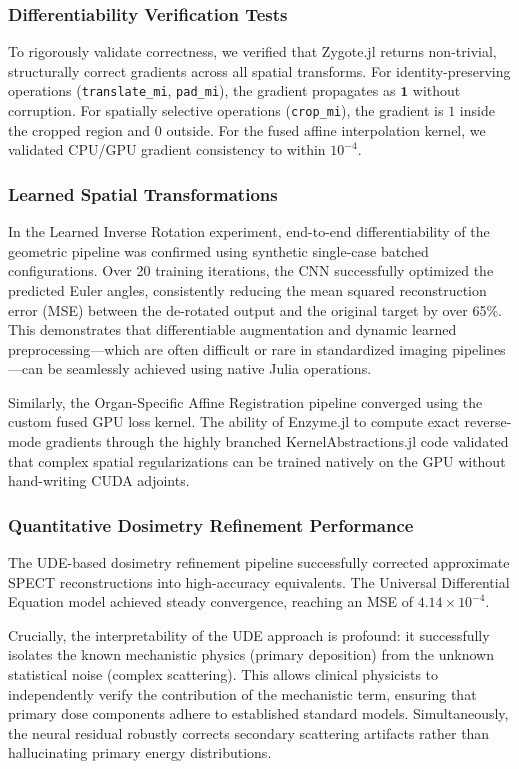 \documentclass[10pt,letterpaper]{article}
\begin{document}
\subsubsection*{Differentiability Verification Tests}
To rigorously validate correctness, we verified that Zygote.jl returns non-trivial, structurally correct gradients across all spatial transforms. For identity-preserving operations (\texttt{translate\_mi}, \texttt{pad\_mi}), the gradient propagates as $\mathbf{1}$ without corruption. For spatially selective operations (\texttt{crop\_mi}), the gradient is $1$ inside the cropped region and $0$ outside. For the fused affine interpolation kernel, we validated CPU/GPU gradient consistency to within $10^{-4}$.

\subsubsection*{Learned Spatial Transformations}
In the Learned Inverse Rotation experiment, end-to-end differentiability of the geometric pipeline was confirmed using synthetic single-case batched configurations. Over 20 training iterations, the CNN successfully optimized the predicted Euler angles, consistently reducing the mean squared reconstruction error (MSE) between the de-rotated output and the original target by over 65\%. This demonstrates that differentiable augmentation and dynamic learned preprocessing---which are often difficult or rare in standardized imaging pipelines \cite{Shi_2023}---can be seamlessly achieved using native Julia operations.

Similarly, the Organ-Specific Affine Registration pipeline converged using the custom fused GPU loss kernel. The ability of Enzyme.jl to compute exact reverse-mode gradients through the highly branched KernelAbstractions.jl code validated that complex spatial regularizations can be trained natively on the GPU without hand-writing CUDA adjoints.

\subsubsection*{Quantitative Dosimetry Refinement Performance}
The UDE-based dosimetry refinement pipeline successfully corrected approximate SPECT reconstructions into high-accuracy equivalents. The Universal Differential Equation model achieved steady convergence, reaching an MSE of $4.14 \times 10^{-4}$. 

Crucially, the interpretability of the UDE approach is profound: it successfully isolates the known mechanistic physics (primary deposition) from the unknown statistical noise (complex scattering). This allows clinical physicists to independently verify the contribution of the mechanistic term, ensuring that primary dose components adhere to established standard models. Simultaneously, the neural residual robustly corrects secondary scattering artifacts rather than hallucinating primary energy distributions. 
\end{document}
